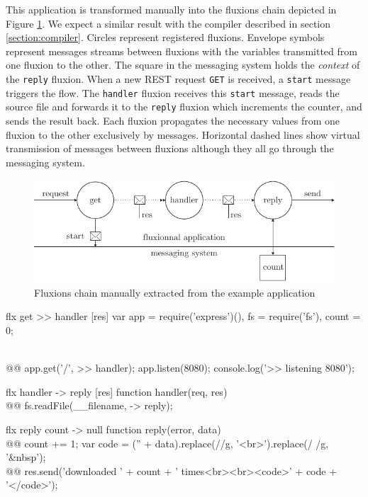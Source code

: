 This application is transformed manually into the fluxions chain depicted in Figure \ref{fig:fluxions}.
We expect a similar result with the compiler described in section \ref{section:compiler}.
Circles represent registered fluxions.
Envelope symbols represent messages streams between fluxions with the variables transmitted from one fluxion to the other.
The square in the messaging system holds the \textit{context} of the \texttt{reply} fluxion.
When a new REST request \texttt{GET} is received, a \texttt{start} message triggers the flow.
The \texttt{handler} fluxion receives this \texttt{start} message, reads the source file and forwards it to the \texttt{reply} fluxion which increments the counter, and sends the result back.
Each fluxion propagates the necessary values from one fluxion to the other exclusively by messages.
Horizontal dashed lines show virtual transmission of messages between fluxions although they all go through the messaging system.

\begin{figure}[h!]
  \includegraphics[width=\linewidth]{ressources/flux.pdf}
  \caption{Fluxions chain manually extracted from the example application}
  \label{fig:fluxions}
\end{figure}

\begin{code}[flx, caption={Manual transformation of the example application in our high-level fluxional language},label={lst:fluxional}]
flx get
>> handler [res]
  var app = require('express')(),
      fs = require('fs'),
      count = 0;

\\@\label{lst:fluxional-streamtohandler}@  app.get('/', >> handler);
  app.listen(8080);
  console.log('>> listening 8080');

flx handler
-> reply [res]
  function handler(req, res) {
\\@\label{lst:fluxional-readfile}@      fs.readFile(__filename, -> reply);
  }

flx reply {count}
-> null
  function reply(error, data) {
\\@\label{lst:fluxional-counter}@    count += 1;
    var code = ('' + data).replace(/\n/g, '<br>').replace(/ /g, '&nbsp');
\\@\label{lst:fluxional-ressend}@    res.send('downloaded ' + count + ' times<br><br><code>' + code + '</code>');
  }
\end{code}

